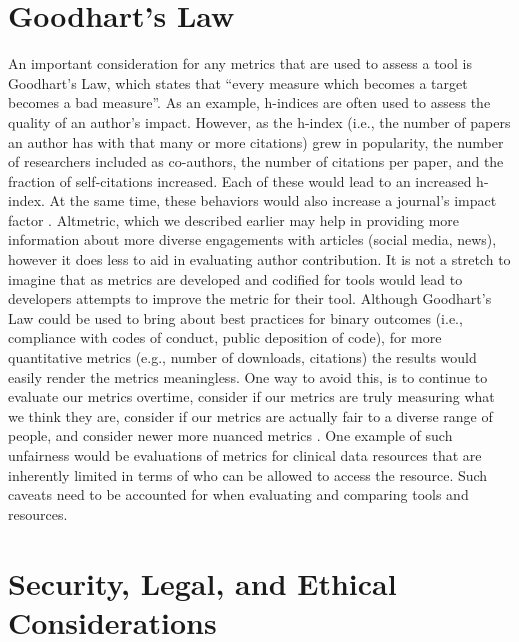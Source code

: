 \documentclass{article}
\begin{document}
\section{Goodhart’s Law}
An important consideration for any metrics that are used to assess a tool is Goodhart’s Law, which states that “every measure which becomes a target becomes a bad measure\cite{hoskin_awful_1996}”. As an example, h-indices are often used to assess the quality of an author’s impact. However, as the h-index (i.e., the number of papers an author has with that many or more citations) grew in popularity, the number of researchers included as co-authors, the number of citations per paper, and the fraction of self-citations increased. Each of these would lead to an increased h-index. At the same time, these behaviors would also increase a journal’s impact factor \cite{fire_over-optimization_2019}. Altmetric, which we described earlier may help in providing more information about more diverse engagements with articles (social media, news), however it does less to aid in evaluating author contribution. It is not a stretch to imagine that as metrics are developed and codified for tools would lead to developers attempts to improve the metric for their tool. Although Goodhart’s Law could be used to bring about best practices for binary outcomes (i.e., compliance with codes of conduct, public deposition of code), for more quantitative metrics (e.g., number of downloads, citations) the results would easily render the metrics meaningless. One way to avoid this, is to continue to evaluate our metrics overtime, consider if our metrics are truly measuring what we think they are, consider if our metrics are actually fair to a diverse range of people, and consider newer more nuanced metrics \cite{fire_over-optimization_2019}. One example of such unfairness would be evaluations of metrics for clinical data resources that are inherently limited in terms of who can be allowed to access the resource. Such caveats need to be accounted for when evaluating and comparing tools and resources.

\section{Security, Legal, and Ethical Considerations}
\end{document}
